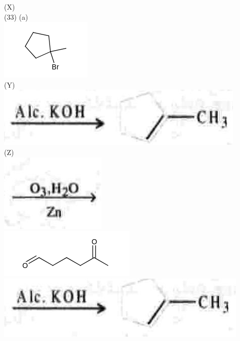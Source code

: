 \documentclass[10pt]{article}
\begin{document}
(X)\\
(33) (a)\\
\includegraphics{smile-8a02a130c48c3565e62e84b6ea71c847af4c0e92}\\
(Y)\\
\includegraphics[max width=\textwidth, center]{2025_01_28_8470952b98110cec3aabg-246(2)}\\
(Z)\\
\includegraphics[max width=\textwidth, center]{2025_01_28_8470952b98110cec3aabg-246(1)}\\
\includegraphics{smile-8355959db013c8364355687a42eb329ba4abee9e}\\
\includegraphics[max width=\textwidth, center]{2025_01_28_8470952b98110cec3aabg-246(4)}\\
\end{document}
